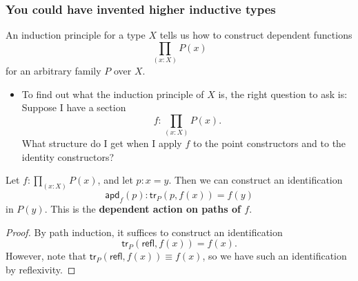 \documentclass[handout]{beamer}
\newcommand{\refl}{\mathsf{refl}}
\newcommand{\apd}{\mathsf{apd}}
\newcommand{\tr}{\mathsf{tr}}
\newcommand{\apply}[2]{#1(#2)}
\begin{document}
\begin{frame}
  \frametitle{You could have invented higher inductive types}
  An induction principle for a type $X$ tells us how to construct dependent functions
  \begin{equation*}
    \prod_{(x:X)}\apply{P}{x}
  \end{equation*}
  for an arbitrary family $P$ over $X$.\pause
  \begin{itemize}
  \item To find out what the induction principle of $X$ is, the right question to ask is: \\[1em]
    
    {\color{red}Suppose I have a section
      \begin{equation*}
        f:\prod_{(x:X)}\apply{P}{x}.  
      \end{equation*}
      What structure do I get when I apply $f$ to the point constructors and to the identity constructors?}
  \end{itemize}
\end{frame}

\begin{frame}
  \begin{lemma}
    Let $f:\prod_{(x:X)}\apply{P}{x}$, and let $p:x=y$. Then we can construct an identification
    \begin{equation*}
      \apply{\apd_f}{p} : \apply{\tr_P}{p,\apply{f}{x}}=\apply{f}{y}
    \end{equation*}
    in $\apply{P}{y}$. This is the \textbf{dependent action on paths of $f$}.
  \end{lemma}\pause

  \begin{proof}
    By path induction, it suffices to construct an identification
    \begin{equation*}
      \apply{\tr_P}{\refl{},\apply{f}{x}}=\apply{f}{x}.
    \end{equation*}
    However, note that $\apply{\tr_P}{\refl{},\apply{f}{x}} \equiv \apply{f}{x}$, so we have such an identification by reflexivity.
  \end{proof}
\end{frame}
\end{document}
